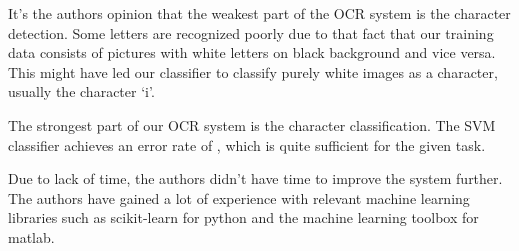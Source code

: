 \documentclass[../main.tex]{subfiles}
\begin{document}
It's the authors opinion that the weakest part of the OCR system is the
character detection. Some letters are recognized poorly due to that fact that
our training data consists of pictures with white letters on black background
and vice versa. This might have led our classifier to classify purely white images as a
character, usually the character `i'.

The strongest part of our OCR system is the character classification. The
SVM classifier achieves an error rate of , which is quite
sufficient for the given task.

Due to lack of time, the authors didn't have time to improve the system further.
The authors have gained a lot of experience with relevant machine learning
libraries such as scikit-learn for python and the machine learning toolbox for
matlab.
\end{document}
